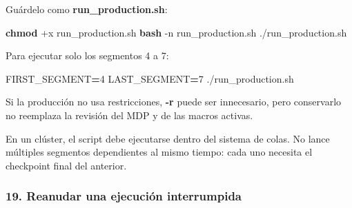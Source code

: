 \documentclass[
  spanish,
  11pt,
  a4paper]{article}
\newenvironment{Shaded}{\begin{snugshade}}{\end{snugshade}}
\newcommand{\AttributeTok}[1]{\textcolor[rgb]{0.13,0.29,0.53}{#1}}
\newcommand{\ControlFlowTok}[1]{\textcolor[rgb]{0.13,0.29,0.53}{\textbf{#1}}}
\newcommand{\DataTypeTok}[1]{\textcolor[rgb]{0.13,0.29,0.53}{#1}}
\newcommand{\ExtensionTok}[1]{#1}
\newcommand{\FunctionTok}[1]{\textcolor[rgb]{0.13,0.29,0.53}{\textbf{#1}}}
\newcommand{\KeywordTok}[1]{\textcolor[rgb]{0.13,0.29,0.53}{\textbf{#1}}}
\newcommand{\NormalTok}[1]{#1}
\newcommand{\OperatorTok}[1]{\textcolor[rgb]{0.81,0.36,0.00}{\textbf{#1}}}
\newcommand{\OtherTok}[1]{\textcolor[rgb]{0.56,0.35,0.01}{#1}}
\newcommand{\StringTok}[1]{\textcolor[rgb]{0.31,0.60,0.02}{#1}}
\newcommand{\VariableTok}[1]{\textcolor[rgb]{0.00,0.00,0.00}{#1}}
\begin{document}
\begin{Shaded}
\end{Shaded}

Guárdelo como \textbf{run\_production.sh}:

\begin{Shaded}
\begin{Highlighting}[]
\FunctionTok{chmod}\NormalTok{ +x run\_production.sh}
\FunctionTok{bash} \AttributeTok{{-}n}\NormalTok{ run\_production.sh}
\ExtensionTok{./run\_production.sh}
\end{Highlighting}
\end{Shaded}

Para ejecutar solo los segmentos 4 a 7:

\begin{Shaded}
\begin{Highlighting}[]
\VariableTok{FIRST\_SEGMENT}\OperatorTok{=}\NormalTok{4 }\VariableTok{LAST\_SEGMENT}\OperatorTok{=}\NormalTok{7 }\ExtensionTok{./run\_production.sh}
\end{Highlighting}
\end{Shaded}

Si la producción no usa restricciones, \textbf{-r} puede ser
innecesario, pero conservarlo no reemplaza la revisión del MDP y de las
macros activas.

En un clúster, el script debe ejecutarse dentro del sistema de colas. No
lance múltiples segmentos dependientes al mismo tiempo: cada uno
necesita el checkpoint final del anterior.

\subsubsection{19. Reanudar una ejecución
interrumpida}\label{reanudar-una-ejecuciuxf3n-interrumpida}
\end{document}
